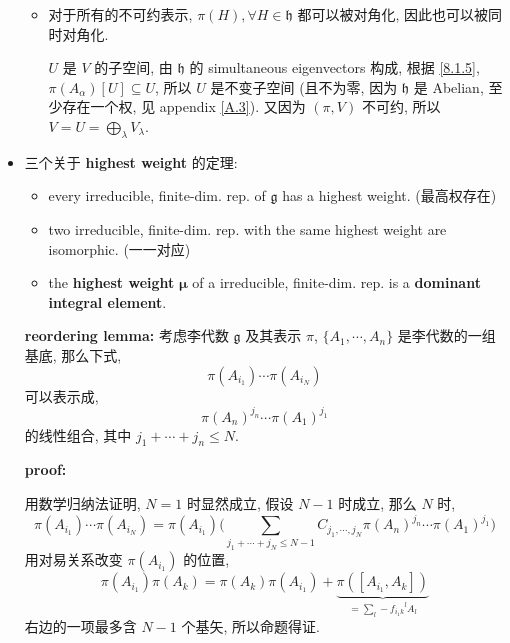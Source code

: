 \begin{itemize}
\begin{itemize}
		\item 对于所有的不可约表示, $\pi(H), \forall H \in \mathfrak{h}$ 都可以被对角化, 因此也可以被同时对角化.
		
		\begin{tcolorbox}[title=proof:]
			$U$ 是 $V$ 的子空间, 由 $\mathfrak{h}$ 的 simultaneous eigenvectors 构成, 根据 \eqref{8.1.5}, $\pi(A_\alpha)[U] \subseteq U$, 所以 $U$ 是不变子空间 (且不为零, 因为 $\mathfrak{h}$ 是 Abelian, 至少存在一个权, 见 appendix \ref{A.3}). 又因为 $(\pi, V)$ 不可约, 所以 $V = U = \bigoplus_\lambda V_\lambda$.
		\end{tcolorbox}
	\end{itemize}
	
	\item 三个关于 \textbf{highest weight} 的定理:
	\begin{itemize}
		\item every irreducible, finite-dim. rep. of $\mathfrak{g}$ has a highest weight. (最高权存在)
		
		\item two irreducible, finite-dim. rep. with the same highest weight are isomorphic. (一一对应)
		
		\item the \textbf{highest weight} $\boldsymbol{\mu}$ of a irreducible, finite-dim. rep. is a \textbf{dominant integral element}.
	\end{itemize}
	
	\begin{tcolorbox}[title=proof:]
		\textbf{reordering lemma:} 考虑李代数 $\mathfrak{g}$ 及其表示 $\pi$, $\{A_1, \cdots, A_n\}$ 是李代数的一组基底, 那么下式,
		\begin{equation}
			\pi(A_{i_1}) \cdots \pi(A_{i_N})
		\end{equation}
		可以表示成,
		\begin{equation} \label{8.1.7}
			\pi(A_n)^{j_n} \cdots \pi(A_1)^{j_1}
		\end{equation}
		的线性组合, 其中 $j_1 + \cdots + j_n \leq N$.
		
		\noindent\hdashrule[0.5ex]{\linewidth}{0.5pt}{1mm} %
		
		\textbf{proof:}
		
		用数学归纳法证明, $N = 1$ 时显然成立, 假设 $N - 1$ 时成立, 那么 $N$ 时,
		\begin{equation}
			\pi(A_{i_1}) \cdots \pi(A_{i_N}) = \pi(A_{i_1}) \Big( \sum_{j_1 + \cdots + j_N \leq N - 1} C_{j_1, \cdots, j_N} \pi(A_n)^{j_n} \cdots \pi(A_1)^{j_1} \Big)
		\end{equation}
		用对易关系改变 $\pi(A_{i_1})$ 的位置,
		\begin{equation}
			\pi(A_{i_1}) \pi(A_k) = \pi(A_k) \pi(A_{i_1}) + \underbrace{\pi([A_{i_1}, A_k])}_{= \sum_l - {f_{i_1 k}}^l A_l}
		\end{equation}
		右边的一项最多含 $N - 1$ 个基矢, 所以命题得证.
		

\end{tcolorbox}
\end{itemize}
